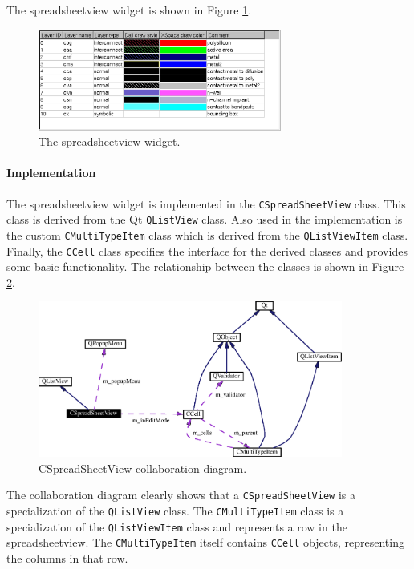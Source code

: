 The spreadsheetview widget is shown in Figure
\ref{fig:uidesign:spreadsheetview}.

\begin{figure}[ht] \begin{center}
\includegraphics[width=8cm]{./figures/ex_spreadsheet.eps}
\caption{The spreadsheetview widget.}
\label{fig:uidesign:spreadsheetview}
\end{center} \end{figure}


\paragraph{Implementation\\ }
\noindent The spreadsheetview widget is implemented in the
\verb=CSpreadSheetView= class. This class is derived from the Qt
\verb=QListView= class. Also used in the implementation is the custom
\verb=CMultiTypeItem= class which is derived from the \verb=QListViewItem=
class. Finally, the \verb=CCell= class specifies the interface for the derived
classes and provides some basic functionality. The relationship between the
classes is shown in Figure \ref{fig:uidesign:spreadsheet_coll}.
\begin{figure} \begin{center}
\includegraphics[width=10cm]{./figures/class_cspreadsheetview_coll_graph.eps}
\caption{CSpreadSheetView collaboration diagram.}
\label{fig:uidesign:spreadsheet_coll}
\end{center} \end{figure}

The collaboration diagram clearly shows that a \verb=CSpreadSheetView= is a
specialization of the \verb=QListView= class. The \verb=CMultiTypeItem= class
is a specialization of the \verb=QListViewItem= class and represents a row in
the spreadsheetview. The \verb=CMultiTypeItem= itself contains \verb=CCell=
objects, representing the columns in that row.

